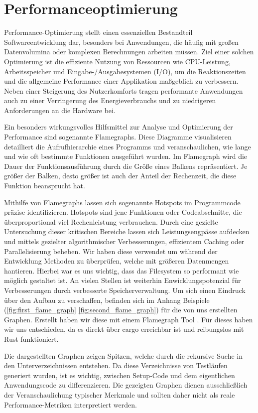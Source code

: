 \section{Performanceoptimierung}\label{sec:Performanceoptimierung}

Performance-Optimierung stellt einen essenziellen Bestandteil Softwareentwicklung dar, besonders bei Anwendungen, die
häufig mit großen Datenvolumina oder komplexen Berechnungen arbeiten müssen. Ziel einer solchen Optimierung ist die effiziente
Nutzung von Ressourcen wie CPU-Leistung, Arbeitsspeicher und Eingabe-/Ausgabesystemen (I/O), um die Reaktionszeiten und die
allgemeine Performance einer Applikation maßgeblich zu verbessern. Neben einer Steigerung des Nutzerkomforts tragen performante
Anwendungen auch zu einer Verringerung des Energieverbrauchs und zu niedrigeren Anforderungen an die Hardware bei.

Ein besonders wirkungsvolles Hilfsmittel zur Analyse und Optimierung der Performance sind sogenannte Flamegraphs. Diese
Diagramme visualisieren detailliert die Aufrufhierarchie eines Programms und veranschaulichen, wie lange und wie oft bestimmte
Funktionen ausgeführt wurden. Im Flamegraph wird die Dauer der Funktionsausführung durch die Größe eines Balkens repräsentiert.
Je größer der Balken, desto größer ist auch der Anteil der Rechenzeit, die diese Funktion beansprucht hat.

Mithilfe von Flamegraphs lassen sich sogenannte Hotspots im Programmcode präzise identifizieren. Hotspots sind jene Funktionen
oder Codeabschnitte, die überproportional viel Rechenleistung verbrauchen. Durch eine gezielte Untersuchung dieser kritischen
Bereiche lassen sich Leistungsengpässe aufdecken und mittels gezielter algorithmischer Verbesserungen, effizientem Caching oder
Parallelisierung beheben. Wir haben diese verwendet um während der Entwicklung Methoden zu überprüfen, welche mit größeren
Datenmengen hantieren. Hierbei war es uns wichtig, dass das Filesystem so performant wie möglich gestaltet ist. An vielen Stellen ist weiterhin Enwicklungspotenzial für Verbesserungen durch verbesserte Speicherverwaltung. Um sich einen Eindruck über den Aufbau zu verschaffen, befinden sich im Anhang Beispiele (\ref{fig:first_flame_graph} \ref{fig:second_flame_graph}) für
die von uns erstellten Graphen. Erstellt haben wir diese mit einem Flamegraph Tool \cite{flamegraph_rs}.
Für dieses haben wir uns entschieden, da es direkt über cargo erreichbar ist und reibungslos mit Rust funktioniert. 

Die dargestellten Graphen zeigen Spitzen, welche durch die rekursive Suche in den Unterverzeichnissen entstehen. Da diese
Verzeichnisse von Testläufen generiert wurden, ist es wichtig, zwischen Setup-Code und dem eigentlichen Anwendungscode zu
differenzieren. Die gezeigten Graphen dienen ausschließlich der Veranschaulichung typischer Merkmale und sollten daher nicht als
reale Performance-Metriken interpretiert werden.
